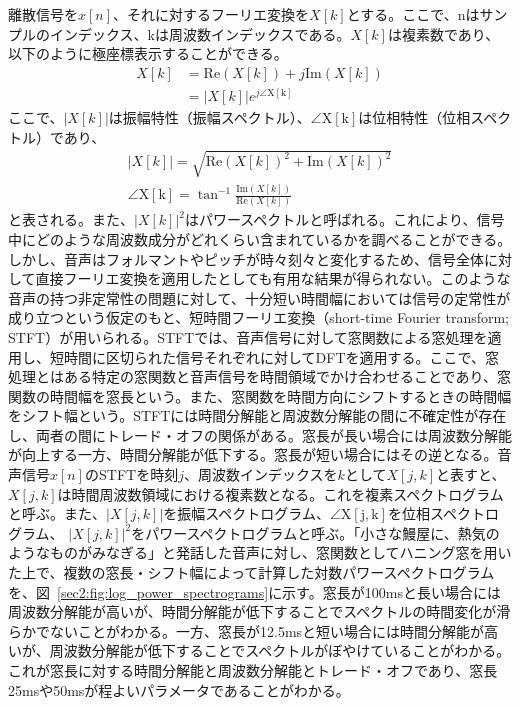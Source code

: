 \documentclass[12pt]{jarticle}
\numberwithin{equation}{section}    %
\numberwithin{figure}{section}      %
\numberwithin{table}{section}      %
\begin{document}
離散信号を$x[n]$、それに対するフーリエ変換を$X[k]$とする。ここで、nはサンプルのインデックス、kは周波数インデックスである。$X[k]$は複素数であり、以下のように極座標表示することができる。
\begin{align}
    X[k] & = \mathrm{Re}(X[k]) + j\mathrm{Im}(X[k]) \\
         & = |X[k]|e^{j\angle\mathrm{X[k]}}
\end{align}
ここで、$|X[k]|$は振幅特性（振幅スペクトル）、$\angle\mathrm{X[k]}$は位相特性（位相スペクトル）であり、
\begin{gather}
    |X[k]| = \sqrt{\mathrm{Re}(X[k])^{2} + \mathrm{Im}(X[k])^{2}} \\
    \angle\mathrm{X[k]} = \tan^{-1} \frac{\mathrm{Im}(X[k])}{\mathrm{Re}(X[k])}
\end{gather}
と表される。また、$|X[k]|^2$はパワースペクトルと呼ばれる。これにより、信号中にどのような周波数成分がどれくらい含まれているかを調べることができる。しかし、音声はフォルマントやピッチが時々刻々と変化するため、信号全体に対して直接フーリエ変換を適用したとしても有用な結果が得られない。このような音声の持つ非定常性の問題に対して、十分短い時間幅においては信号の定常性が成り立つという仮定のもと、短時間フーリエ変換（short-time Fourier transform; STFT）が用いられる。STFTでは、音声信号に対して窓関数による窓処理を適用し、短時間に区切られた信号それぞれに対してDFTを適用する。ここで、窓処理とはある特定の窓関数と音声信号を時間領域でかけ合わせることであり、窓関数の時間幅を窓長という。また、窓関数を時間方向にシフトするときの時間幅をシフト幅という。STFTには時間分解能と周波数分解能の間に不確定性が存在し、両者の間にトレード・オフの関係がある。窓長が長い場合には周波数分解能が向上する一方、時間分解能が低下する。窓長が短い場合にはその逆となる。音声信号$x[n]$のSTFTを時刻$j$、周波数インデックスを$k$として$X[j, k]$と表すと、$X[j, k]$は時間周波数領域における複素数となる。これを複素スペクトログラムと呼ぶ。また、$|X[j, k]|$を振幅スペクトログラム、$\angle\mathrm{X[j, k]}$を位相スペクトログラム、
$|X[j, k]|^{2}$をパワースペクトログラムと呼ぶ。「小さな鰻屋に、熱気のようなものがみなぎる」と発話した音声に対し、窓関数としてハニング窓を用いた上で、複数の窓長・シフト幅によって計算した対数パワースペクトログラムを、図~\ref{sec2:fig:log_power_spectrograms}に示す。窓長が100msと長い場合には周波数分解能が高いが、時間分解能が低下することでスペクトルの時間変化が滑らかでないことがわかる。一方、窓長が12.5msと短い場合には時間分解能が高いが、周波数分解能が低下することでスペクトルがぼやけていることがわかる。これが窓長に対する時間分解能と周波数分解能とトレード・オフであり、窓長25msや50msが程よいパラメータであることがわかる。
\end{document}
